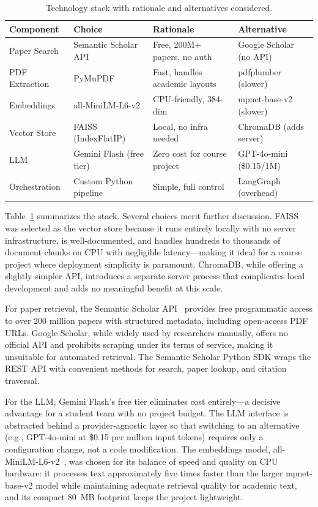 \documentclass[12pt,a4paper]{article}
\begin{document}
\begin{table}[htbp]
\centering
\caption{Technology stack with rationale and alternatives considered.}
\label{tab:stack}
\begin{tabular}{@{}llll@{}}
\toprule
\textbf{Component} & \textbf{Choice} & \textbf{Rationale} & \textbf{Alternative} \\
\midrule
Paper Search & Semantic Scholar API & Free, 200M+ papers, no auth & Google Scholar (no API) \\
PDF Extraction & PyMuPDF & Fast, handles academic layouts & pdfplumber (slower) \\
Embeddings & all-MiniLM-L6-v2 & CPU-friendly, 384-dim & mpnet-base-v2 (slower) \\
Vector Store & FAISS (IndexFlatIP) & Local, no infra needed & ChromaDB (adds server) \\
LLM & Gemini Flash (free tier) & Zero cost for course project & GPT-4o-mini (\$0.15/1M) \\
Orchestration & Custom Python pipeline & Simple, full control & LangGraph (overhead) \\
\bottomrule
\end{tabular}
\end{table}

Table~\ref{tab:stack} summarizes the stack. Several choices merit further discussion. FAISS~\citep{johnson2019faiss} was selected as the vector store because it runs entirely locally with no server infrastructure, is well-documented, and handles hundreds to thousands of document chunks on CPU with negligible latency---making it ideal for a course project where deployment simplicity is paramount. ChromaDB, while offering a slightly simpler API, introduces a separate server process that complicates local development and adds no meaningful benefit at this scale.

For paper retrieval, the Semantic Scholar API~\citep{ammar2018semanticscholar} provides free programmatic access to over 200 million papers with structured metadata, including open-access PDF URLs. Google Scholar, while widely used by researchers manually, offers no official API and prohibits scraping under its terms of service, making it unsuitable for automated retrieval. The Semantic Scholar Python SDK wraps the REST API with convenient methods for search, paper lookup, and citation traversal.

For the LLM, Gemini Flash's free tier eliminates cost entirely---a decisive advantage for a student team with no project budget. The LLM interface is abstracted behind a provider-agnostic layer so that switching to an alternative (e.g., GPT-4o-mini at \$0.15 per million input tokens) requires only a configuration change, not a code modification. The embeddings model, all-MiniLM-L6-v2~\citep{reimers2019sbert}, was chosen for its balance of speed and quality on CPU hardware: it processes text approximately five times faster than the larger mpnet-base-v2 model while maintaining adequate retrieval quality for academic text, and its compact 80~MB footprint keeps the project lightweight.
\end{document}
